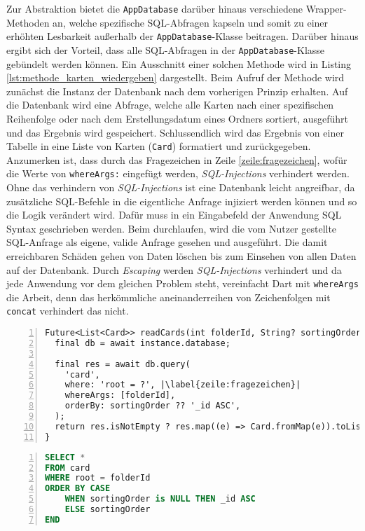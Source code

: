 Zur Abstraktion bietet die \texttt{AppDatabase} darüber hinaus verschiedene Wrapper-Methoden an, welche spezifische SQL-Abfragen kapseln und somit zu einer erhöhten Lesbarkeit außerhalb der \texttt{AppDatabase}-Klasse beitragen. Darüber hinaus ergibt sich der Vorteil, dass alle SQL-Abfragen in der \texttt{AppDatabase}-Klasse gebündelt werden können. Ein Ausschnitt einer solchen Methode wird in Listing \ref{lst:methode_karten_wiedergeben} dargestellt. Beim Aufruf der Methode wird zunächst die Instanz der Datenbank nach dem vorherigen Prinzip erhalten. Auf die Datenbank wird eine Abfrage, welche alle Karten nach einer spezifischen Reihenfolge oder nach dem Erstellungsdatum eines Ordners sortiert, ausgeführt und das Ergebnis wird gespeichert. Schlussendlich wird das Ergebnis von einer Tabelle in eine Liste von Karten (\texttt{Card}) formatiert und zurückgegeben. Anzumerken ist, dass durch das Fragezeichen in Zeile \ref{zeile:fragezeichen}, wofür die Werte von \texttt{whereArgs:} eingefügt werden, \textit{SQL-Injections} verhindert werden. Ohne das verhindern von \textit{SQL-Injections} ist eine Datenbank leicht angreifbar, da zusätzliche SQL-Befehle in die eigentliche Anfrage injiziert werden können und so die Logik verändert wird. Dafür muss in ein Eingabefeld der Anwendung SQL Syntax geschrieben werden. Beim durchlaufen, wird die vom Nutzer gestellte SQL-Anfrage als eigene, valide Anfrage gesehen und ausgeführt. Die damit erreichbaren Schäden gehen von Daten löschen bis zum Einsehen von allen Daten auf der Datenbank. Durch \textit{Escaping} werden \textit{SQL-Injections} verhindert und da jede Anwendung vor dem gleichen Problem steht, vereinfacht Dart mit \texttt{whereArgs} die Arbeit, denn das herkömmliche aneinanderreihen von Zeichenfolgen mit \texttt{concat} verhindert das nicht.

\begin{lstlisting}[caption={Methode, welche alle Karten eines Ordners wiedergibt},captionpos=b,label={lst:methode_karten_wiedergeben},numbers=left,frame=none,escapechar=|]
Future<List<Card>> readCards(int folderId, String? sortingOrder) async {
  final db = await instance.database;

  final res = await db.query(
    'card',
    where: 'root = ?', |\label{zeile:fragezeichen}|
    whereArgs: [folderId],
    orderBy: sortingOrder ?? '_id ASC',
  );
  return res.isNotEmpty ? res.map((e) => Card.fromMap(e)).toList() : [];
}
\end{lstlisting}

\begin{lstlisting}[caption={Anfrage aus Listing \ref{lst:methode_karten_wiedergeben} als herkömmliche SQL-Anfrage},language=sql,captionpos=b,label={lst:sql_anfrage},numbers=left,frame=none,escapechar=|]
SELECT *
FROM card
WHERE root = folderId
ORDER BY CASE 
    WHEN sortingOrder is NULL THEN _id ASC 
    ELSE sortingOrder
END
\end{lstlisting}

